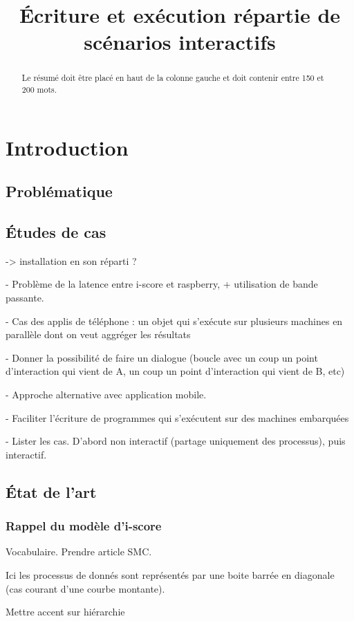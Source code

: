 \documentclass{article}
\title{Écriture et exécution répartie de scénarios interactifs}
\newcommand\trigger{point d'interaction\xspace}
\begin{document}
\maketitle
\begin{abstract}
Le résumé doit être placé en haut de la colonne gauche et doit contenir entre 150 et 200 mots.
\end{abstract}
\section{Introduction}
\subsection{Problématique}

\subsection{Études de cas}
-> installation en son réparti ?

- Problème de la latence entre i-score et raspberry, + utilisation de bande passante.

- Cas des applis de téléphone : un objet qui s'exécute sur plusieurs machines en parallèle dont on veut aggréger les résultats

- Donner la possibilité de faire un dialogue (boucle avec un coup un \trigger qui vient de A, un coup un \trigger qui vient de B, etc)

- Approche alternative avec application mobile.

- Faciliter l'écriture de programmes qui s'exécutent sur des machines embarquées

- Lister les cas. D'abord non interactif (partage uniquement des processus), puis interactif.

\subsection{État de l'art}
\subsubsection{Rappel du modèle d'i-score}
Vocabulaire. Prendre article SMC.

Ici les processus de donnés sont représentés par une boite barrée en diagonale (cas courant d'une courbe montante).

Mettre accent sur hiérarchie
\end{document}
